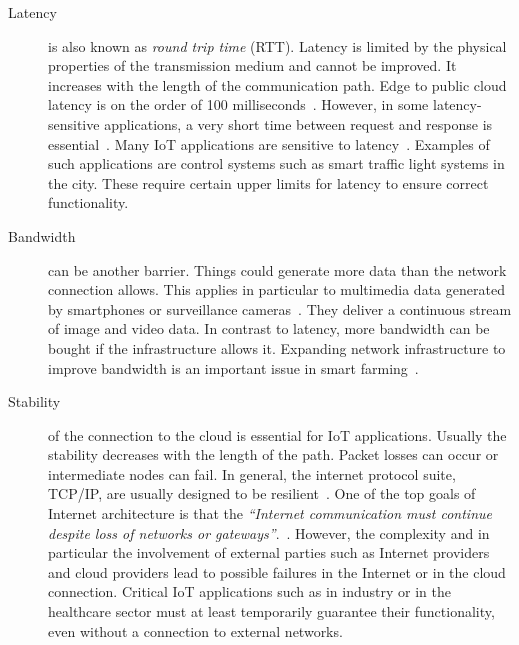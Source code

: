\documentclass[english,version-2019-11]{uzl-thesis}
\begin{document}
\begin{description}
\item[Latency] is also known as \emph{round trip time} (RTT). Latency is
limited by the physical properties of the transmission medium and cannot be improved.
It increases with the length of the communication path.
Edge to public cloud latency is on the order
of 100 milliseconds~\cite{DemystifyingFog}.
However, in some latency-sensitive applications,
a very short time between request and response is
essential~\cite{FogAndCloud}. Many IoT applications are sensitive
to latency~\cite{DemystifyingFog}. Examples of such applications
are control systems such as smart traffic light systems
in the city. These require certain upper limits for
latency to ensure correct functionality.
\item[Bandwidth] can be another barrier.
Things could generate more data than the network connection
allows. This applies in particular to multimedia
data generated by smartphones or surveillance cameras~\cite{DemystifyingFog}.
They deliver a continuous stream of image and video data.
In contrast to latency, more bandwidth can be bought
if the infrastructure allows it.
Expanding network infrastructure to improve bandwidth
is an important issue in smart farming~\cite{Farming}.
\item[Stability] of the connection to the cloud
is essential for IoT applications.
Usually the stability decreases with the length of the path.
Packet losses can occur or intermediate nodes can fail.
In general, the internet protocol suite, TCP/IP, are usually
designed to be resilient~\cite{InternetDesign}. One of
the top goals of Internet architecture is that the 
\emph{``Internet communication must continue
despite loss of networks or gateways''}.~\cite{InternetDesign}.
However, the complexity and in particular
the involvement of external parties such as Internet
providers and cloud providers lead to possible
failures in the Internet or in the cloud connection.
Critical IoT applications such as in industry
or in the healthcare sector must at least temporarily
guarantee their functionality, even without a connection
to external networks.
\end{description}
\end{document}
